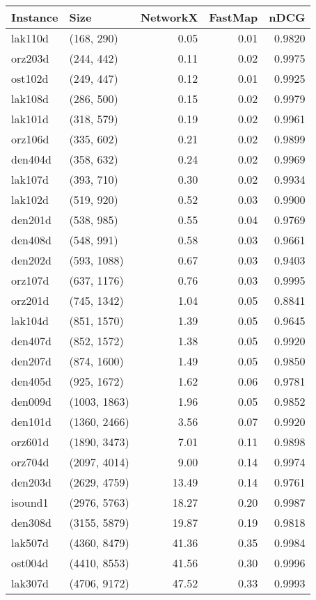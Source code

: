 \begin{tabular}{llrrr}
\toprule
Instance &         Size &  NetworkX &  FastMap &   nDCG \\
\midrule
 lak110d &   (168, 290) &      0.05 &     0.01 & 0.9820 \\
 orz203d &   (244, 442) &      0.11 &     0.02 & 0.9975 \\
 ost102d &   (249, 447) &      0.12 &     0.01 & 0.9925 \\
 lak108d &   (286, 500) &      0.15 &     0.02 & 0.9979 \\
 lak101d &   (318, 579) &      0.19 &     0.02 & 0.9961 \\
 orz106d &   (335, 602) &      0.21 &     0.02 & 0.9899 \\
 den404d &   (358, 632) &      0.24 &     0.02 & 0.9969 \\
 lak107d &   (393, 710) &      0.30 &     0.02 & 0.9934 \\
 lak102d &   (519, 920) &      0.52 &     0.03 & 0.9900 \\
 den201d &   (538, 985) &      0.55 &     0.04 & 0.9769 \\
 den408d &   (548, 991) &      0.58 &     0.03 & 0.9661 \\
 den202d &  (593, 1088) &      0.67 &     0.03 & 0.9403 \\
 orz107d &  (637, 1176) &      0.76 &     0.03 & 0.9995 \\
 orz201d &  (745, 1342) &      1.04 &     0.05 & 0.8841 \\
 lak104d &  (851, 1570) &      1.39 &     0.05 & 0.9645 \\
 den407d &  (852, 1572) &      1.38 &     0.05 & 0.9920 \\
 den207d &  (874, 1600) &      1.49 &     0.05 & 0.9850 \\
 den405d &  (925, 1672) &      1.62 &     0.06 & 0.9781 \\
 den009d & (1003, 1863) &      1.96 &     0.05 & 0.9852 \\
 den101d & (1360, 2466) &      3.56 &     0.07 & 0.9920 \\
 orz601d & (1890, 3473) &      7.01 &     0.11 & 0.9898 \\
 orz704d & (2097, 4014) &      9.00 &     0.14 & 0.9974 \\
 den203d & (2629, 4759) &     13.49 &     0.14 & 0.9761 \\
 isound1 & (2976, 5763) &     18.27 &     0.20 & 0.9987 \\
 den308d & (3155, 5879) &     19.87 &     0.19 & 0.9818 \\
 lak507d & (4360, 8479) &     41.36 &     0.35 & 0.9984 \\
 ost004d & (4410, 8553) &     41.56 &     0.30 & 0.9996 \\
 lak307d & (4706, 9172) &     47.52 &     0.33 & 0.9993 \\
\bottomrule
\end{tabular}
